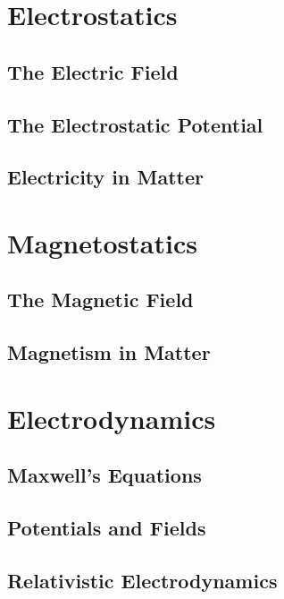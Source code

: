\documentclass{book}
\theoremstyle{definition}
\theoremstyle{remark}
\begin{document}

\tableofcontents
\part{Electrostatics}
\chapter{The Electric Field}
%

\chapter{The Electrostatic Potential}

\chapter{Electricity in Matter}

\part{Magnetostatics}
\chapter{The Magnetic Field}

\chapter{Magnetism in Matter}

\part{Electrodynamics}
\chapter{Maxwell's Equations}

\chapter{Potentials and Fields}
\chapter{Relativistic Electrodynamics}
\appendix
\end{document}
